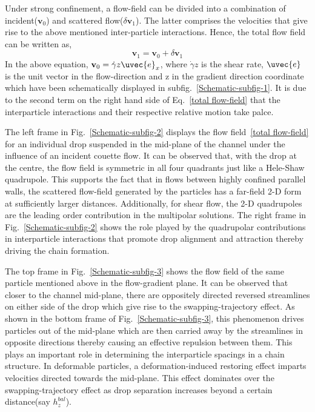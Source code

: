Under strong confinement, a flow-field can be divided into a combination of incident($\mathbf v_0$) and scattered flow($\delta \mathbf{v}_{1}$). The latter comprises the velocities that give rise to the above mentioned inter-particle interactions. Hence, the total flow field can be written as,
\begin{equation}
  \mathbf{v}_1 = \mathbf{v}_0 + \delta \mathbf{v}_{1}
  \label{total flow-field}
\end{equation}
In the above equation,  $\mathbf v_0 = \dot{\gamma}z \uvec{e}_x$, where $\dot{\gamma}z$ is the shear rate, $\uvec{e}$ is the unit vector in the flow-direction and z in the gradient direction coordinate which have been schematically displayed in subfig.~\ref{Schematic-subfig-1}. It is due to the second term on the right hand side of Eq.~\ref{total flow-field} that the interparticle interactions and their respective relative motion take palce.

The left frame in Fig.~\ref{Schematic-subfig-2} displays the flow field~\ref{total flow-field} for an individual drop suspended in the mid-plane of the channel under the influence of an incident couette flow. It can be observed that, with the drop at the centre, the flow field is symmetric in all four quadrants just like a Hele-Shaw quadrupole. This supports the fact that in flows between highly confined parallel walls, the scattered flow-field generated by the particles has a far-field 2-D form at sufficiently larger distances. Additionally, for shear flow, the 2-D quadrupoles are the leading order contribution in the multipolar solutions. The right frame in Fig.~\ref{Schematic-subfig-2} shows the role played by the quadrupolar contributions in interparticle  interactions that promote drop alignment and attraction thereby driving the chain formation.

The top frame in Fig.~\ref{Schematic-subfig-3} shows the flow field of the same particle mentioned above in the flow-gradient plane. It can be observed that closer to the channel mid-plane, there are oppositely directed reversed streamlines on either side of the drop which give rise to the swapping-trajectory effect. As shown in the bottom frame of Fig.~\ref{Schematic-subfig-3}, this phenomenon drives particles out of the mid-plane which are then carried away by the streamlines in opposite directions thereby causing an effective repulsion between them. This plays an important role in determining the interparticle spacings in a chain structure. In deformable particles, a deformation-induced restoring effect imparts velocities directed towards the mid-plane. This effect dominates over the swapping-trajectory effect as drop separation increases beyond a certain distance(say $h_{z}^{bal}$).


